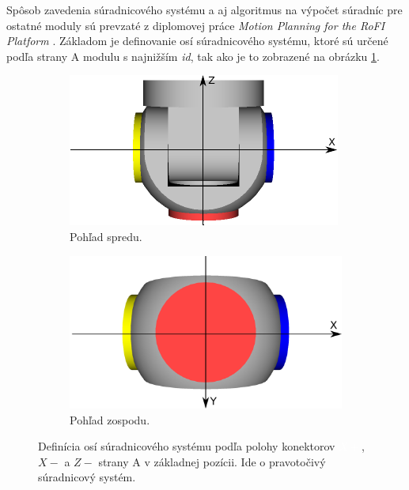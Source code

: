 \documentclass[
  digital, %
  oneside, %
  notable,   %
  lof,     %
  nolot,     %
]{fithesis3}
\begin{document}
Spôsob zavedenia súradnicového systému a aj algoritmus na výpočet súradníc pre ostatné moduly sú prevzaté z diplomovej práce \textit{Motion Planning for the RoFI Platform} \cite{vozarovaMasterThesis}. Základom je definovanie osí súradnicového systému, ktoré sú určené podľa strany A modulu s najnižším \textit{id}, tak ako je to zobrazené na obrázku \ref{fig:moduleAxis}. 

\begin{figure}[hbt!]
    \centering
    \begin{subfigure}[b]{0.47\textwidth}
        \includegraphics[width=\textwidth]{pictures/module_dock_identification.pdf}
        \caption[Pohľad spredu]{Pohľad spredu.}
    \end{subfigure}
    \begin{subfigure}[b]{0.47\textwidth}
        \includegraphics[width=\textwidth]{pictures/module_dock_identification_bottom.pdf}
        \caption[Pohľad zospodu]{Pohľad zospodu.}
    \end{subfigure}
    \caption[Definícia osí súradnicového systému]{Definícia osí súradnicového systému podľa polohy konektorov \textcolor{white}{\colorbox{modra}{$X+$}}, \colorbox{zlta}{$X-$} a \colorbox{cervena}{$Z-$} strany A v základnej pozícii. Ide o pravotočivý súradnicový systém. }
    \label{fig:moduleAxis}
\end{figure}
\end{document}
